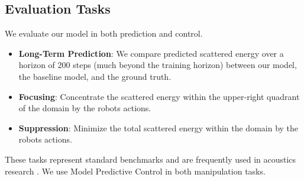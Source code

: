 
\subsection{Evaluation Tasks}
We evaluate our model in both prediction and control.
\begin{itemize}
    \item \textbf{Long-Term Prediction}: We compare predicted scattered energy over a horizon of 200 steps (much beyond the training horizon) between our model, the baseline model, and the ground truth. 
    \item \textbf{Focusing}: Concentrate the scattered energy within the upper-right quadrant of the domain by the robots actions. 
    \item \textbf{Suppression}: Minimize the total scattered energy within the domain by the robots actions.
\end{itemize}
These tasks represent standard benchmarks and are frequently used in acoustics research \cite{amirkulova_2020_the, norris_2008_acoustic}. We use Model Predictive Control in both manipulation tasks.

